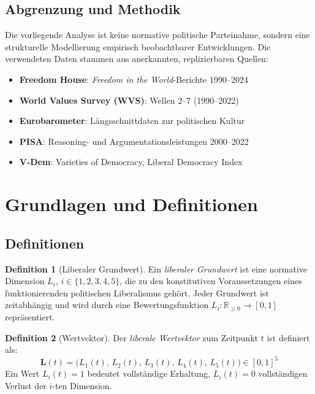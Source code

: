 ﻿\documentclass[a4paper,12pt]{article}
\theoremstyle{definition}
\newtheorem{definition}{Definition}
\begin{document}
\subsection{Abgrenzung und Methodik}

Die vorliegende Analyse ist keine normative politische Parteinahme, sondern eine strukturelle Modellierung empirisch beobachtbarer Entwicklungen. Die verwendeten Daten stammen aus anerkannten, replizier\-baren Quellen:

\begin{itemize}
	\item \textbf{Freedom House}: \textit{Freedom in the World}-Berichte 1990--2024 \cite{FH2024}
	\item \textbf{World Values Survey (WVS)}: Wellen 2--7 (1990--2022) \cite{WVS2022}
	\item \textbf{Eurobarometer}: Längsschnittdaten zur politischen Kultur \cite{EB2023}
	\item \textbf{PISA}: Reasoning- und Argumentationsleistungen 2000--2022 \cite{PISA2022}
	\item \textbf{V-Dem}: Varieties of Democracy, Liberal Democracy Index \cite{VDEM2024}
\end{itemize}

\section{Grundlagen und Definitionen}

\subsection{Definitionen}

\begin{definition}[Liberaler Grundwert]
Ein \emph{liberaler Grundwert} ist eine normative Dimension $L_i$, $i \in \{1, 2, 3, 4, 5\}$, die zu den konstitutiven Voraussetzungen eines funktionierenden politischen Liberalismus gehört. Jeder Grundwert ist zeitabhängig und wird durch eine Bewertungsfunktion $L_i : \mathbb{R}_{\geq 0} \to [0,1]$ repräsentiert.
\end{definition}

\begin{definition}[Wertvektor]
Der \emph{liberale Wertvektor} zum Zeitpunkt $t$ ist definiert als:
\[
\mathbf{L}(t) = \bigl(L_1(t),\, L_2(t),\, L_3(t),\, L_4(t),\, L_5(t)\bigr) \in [0,1]^5
\]
Ein Wert $L_i(t) = 1$ bedeutet vollständige Erhaltung, $L_i(t) = 0$ vollständigen Verlust der $i$-ten Dimension.
\end{definition}
\end{document}
